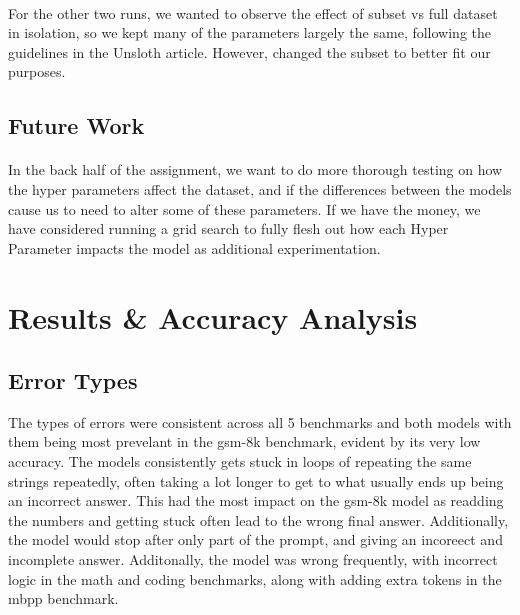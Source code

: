 \documentclass[11pt]{article}
\begin{document}
\paragraph{}For the other two runs, we wanted to observe the effect of subset vs full dataset in isolation, so we kept many of the parameters largely the same, following the guidelines in the Unsloth article. However, changed the subset to better fit our purposes.

\subsection{Future Work}
\paragraph{}In the back half of the assignment, we want to do more thorough testing on how the hyper parameters affect the dataset, and if the differences between the models cause us to need to alter some of these parameters. If we have the money, we have considered running a grid search to fully flesh out how each Hyper Parameter impacts the model as additional experimentation.

\section{Results \& Accuracy Analysis}
\begin{table}[H]
\centering
{}
\caption{Performance for the sft-1 and sft-4 models and 5 benchmarks}
\label{tab2}
\end{table}
\subsection{Error Types}
The types of errors were consistent across all 5 benchmarks and both models with them being most prevelant in the gsm-8k benchmark, evident by its very low accuracy. The models consistently gets stuck in loops of repeating the same strings repeatedly, often taking a lot longer to get to what usually ends up being an incorrect answer. This had the most impact on the gsm-8k model as readding the numbers and getting stuck often lead to the wrong final answer. Additionally, the model would stop after only part of the prompt, and giving an incoreect and incomplete answer.
Additonally, the model was wrong frequently, with incorrect logic in the math and coding benchmarks, along with adding extra tokens in the mbpp benchmark. 
\end{document}
